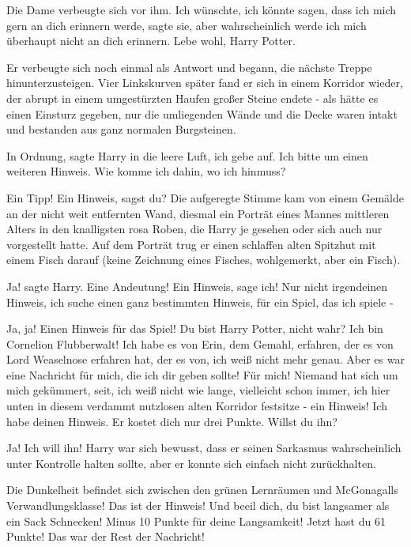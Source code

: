 Die Dame verbeugte sich vor ihm. \glqq Ich wünschte, ich könnte sagen, dass ich
mich gern an dich erinnern werde\grqq{}, sagte sie, \glqq aber wahrscheinlich
werde ich mich überhaupt nicht an dich erinnern. Lebe wohl, Harry Potter.\grqq{}

Er verbeugte sich noch einmal als Antwort und begann, die nächste Treppe
hinunterzusteigen. Vier Linkskurven später fand er sich in einem Korridor
wieder, der abrupt in einem umgestürzten Haufen großer Steine endete - als hätte
es einen Einsturz gegeben, nur die umliegenden Wände und die Decke waren intakt
und bestanden aus ganz normalen Burgsteinen.

\glqq In Ordnung\grqq{}, sagte Harry in die leere Luft, \glqq ich gebe auf. Ich
bitte um einen weiteren Hinweis. Wie komme ich dahin, wo ich hinmuss?\grqq{}

\glqq Ein Tipp! Ein Hinweis, sagst du?\grqq{} Die aufgeregte Stimme kam von
einem Gemälde an der nicht weit entfernten Wand, diesmal ein Porträt eines
Mannes mittleren Alters in den knalligsten rosa Roben, die Harry je gesehen oder
sich auch nur vorgestellt hatte. Auf dem Porträt trug er einen schlaffen alten
Spitzhut mit einem Fisch darauf (keine Zeichnung eines Fisches, wohlgemerkt,
aber ein Fisch).

\glqq Ja!\grqq{} sagte Harry. \glqq Eine Andeutung! Ein Hinweis, sage ich! Nur
nicht irgendeinen Hinweis, ich suche einen ganz bestimmten Hinweis, für ein
Spiel, das ich spiele -\grqq{}

\glqq Ja, ja! Einen Hinweis für das Spiel! Du bist Harry Potter, nicht wahr? Ich
bin Cornelion Flubberwalt! Ich habe es von Erin, dem Gemahl, erfahren, der es
von Lord Weaselnose erfahren hat, der es von, ich weiß nicht mehr genau. Aber es
war eine Nachricht für mich, die ich dir geben sollte! Für mich! Niemand hat
sich um mich gekümmert, seit, ich weiß nicht wie lange, vielleicht schon immer,
ich hier unten in diesem verdammt nutzlosen alten Korridor festsitze - ein
Hinweis! Ich habe deinen Hinweis. Er kostet dich nur drei Punkte. Willst du
ihn?\grqq{}

\glqq Ja! Ich will ihn!\grqq{} Harry war sich bewusst, dass er seinen Sarkasmus
wahrscheinlich unter Kontrolle halten sollte, aber er konnte sich einfach nicht
zurückhalten.

\glqq Die Dunkelheit befindet sich zwischen den grünen Lernräumen und
McGonagalls Verwandlungsklasse! Das ist der Hinweis! Und beeil dich, du bist
langsamer als ein Sack Schnecken! Minus 10 Punkte für deine Langsamkeit! Jetzt
hast du 61 Punkte! Das war der Rest der Nachricht!\grqq{}

